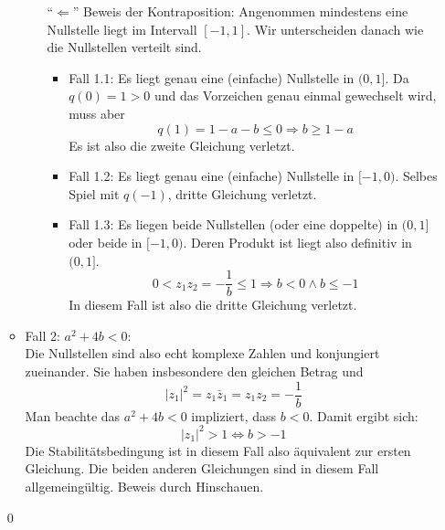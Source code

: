 \documentclass[a4paper,11pt,notitlepage,fullpage]{article}
\begin{document}
\begin{enumerate}
\begin{itemize}
\begin{itemize}
\item[``$\Leftarrow$'']
Beweis der Kontraposition: Angenommen mindestens eine Nullstelle liegt im Intervall $[-1, 1]$. Wir unterscheiden danach wie die Nullstellen verteilt sind.
\begin{itemize}
\item Fall 1.1: Es liegt genau eine (einfache) Nullstelle in $(0, 1]$. Da $q(0) = 1 > 0$ und das Vorzeichen genau einmal gewechselt wird, muss aber $$q(1) = 1 - a - b \leq 0 \Rightarrow b \geq 1 - a$$ Es ist also die zweite Gleichung verletzt.

\item Fall 1.2: Es liegt genau eine (einfache) Nullstelle in $[-1, 0)$. Selbes Spiel mit $q(-1)$, dritte Gleichung verletzt.

\item Fall 1.3: Es liegen beide Nullstellen (oder eine doppelte) in $(0, 1]$ oder beide in $[-1, 0)$. Deren Produkt ist liegt also definitiv in $(0, 1]$.
$$0 < z_1 z_2 = -\frac{1}{b} \leq 1 \Rightarrow b < 0 \wedge b \leq -1$$
In diesem Fall ist also die dritte Gleichung verletzt.

\end{itemize}

\end{itemize}

\item Fall 2: $a^2 + 4b < 0$: \\
Die Nullstellen sind also echt komplexe Zahlen und konjungiert zueinander. Sie haben insbesondere den gleichen Betrag und
$$|z_1|^2 = z_1 \bar z_1 = z_1 z_2 = -\frac{1}{b}$$
Man beachte das $a^2 + 4b < 0$ impliziert, dass $b < 0$. Damit ergibt sich:
$$|z_1|^2 > 1 \Leftrightarrow b > -1$$
Die Stabilitätsbedingung ist in diesem Fall also äquivalent zur ersten Gleichung. Die beiden anderen Gleichungen sind in diesem Fall allgemeingültig. Beweis durch Hinschauen.
\end{itemize}
\qed

\end{enumerate}
\end{document}

